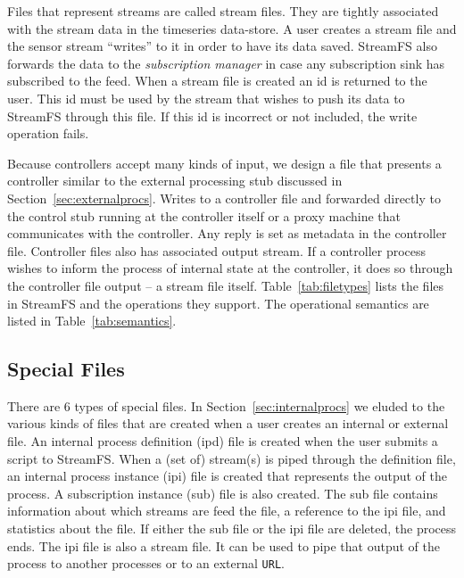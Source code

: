Files that represent streams are called stream files.  They are tightly associated with the stream data in the timeseries data-store.
A user creates a stream file and the sensor  stream ``writes'' to it in order to have its data saved.  StreamFS also forwards the
data to the \emph{subscription manager} in case any subscription sink has subscribed to the feed.  When a stream file is created an id is 
returned to the user.  This id must be used by the stream that wishes to push its data to StreamFS through this file.  If this id is incorrect
or not included, the write operation fails.

Because controllers accept many kinds of input, we design a file that presents a controller similar to the external processing stub discussed
in Section~\ref{sec:externalprocs}.  Writes to a controller file and forwarded directly to the control stub running at the controller itself or a proxy
machine that communicates with the controller.  Any reply is set as metadata in the controller file.  Controller files also has associated output stream.
If a controller process wishes to inform the process of internal state at the controller, it does so through the controller file output --
a stream file itself.  Table~\ref{tab:filetypes} lists the files in StreamFS and the operations they support.  The operational semantics
are listed in Table~\ref{tab:semantics}.



\subsection{Special Files}
There are 6 types of special files.  In Section~\ref{sec:internalprocs} we eluded to the various kinds of files that are created
when a user creates an internal or external file.  An internal process definition (ipd) file is created when the user
submits a script to StreamFS.  When a (set of) stream(s) is piped through the definition file, an internal process instance (ipi) file
is created that represents the output of the process.  A subscription instance (sub) file is also created.  The sub file contains
information about which streams are feed the file, a reference to the ipi file, and statistics about the file.  If either
the sub file or the ipi file are deleted, the process ends.  The ipi file is also a stream file.  It can be used to pipe that
output of the process to another processes or to an external \texttt{URL}.

